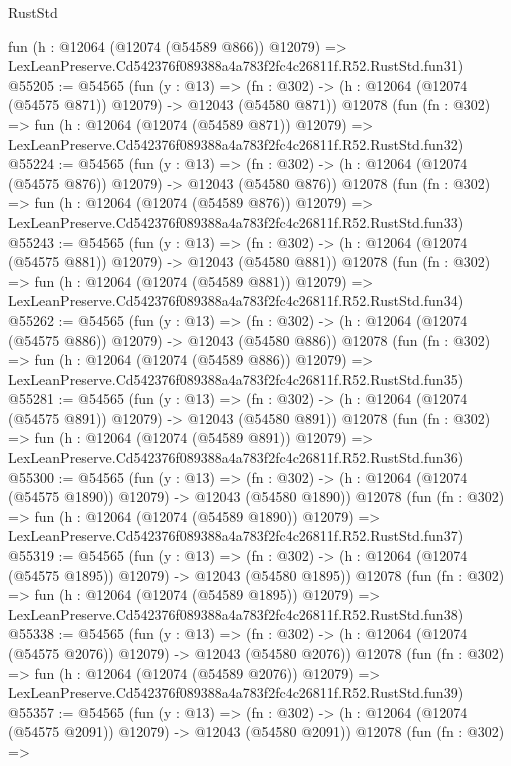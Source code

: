\begin{lexlean}{RustStd}
\begin{coremodule}
    fun (h : @12064 (@12074 (@54589 @866)) @12079) =>
    LexLeanPreserve.Cd542376f089388a4a783f2fc4c26811f.R52.RustStd.fun31)
@55205 := @54565
    (fun (y : @13) =>
    (fn : @302) -> (h : @12064 (@12074 (@54575 @871)) @12079) -> @12043 (@54580 @871))
    @12078
    (fun (fn : @302) =>
    fun (h : @12064 (@12074 (@54589 @871)) @12079) =>
    LexLeanPreserve.Cd542376f089388a4a783f2fc4c26811f.R52.RustStd.fun32)
@55224 := @54565
    (fun (y : @13) =>
    (fn : @302) -> (h : @12064 (@12074 (@54575 @876)) @12079) -> @12043 (@54580 @876))
    @12078
    (fun (fn : @302) =>
    fun (h : @12064 (@12074 (@54589 @876)) @12079) =>
    LexLeanPreserve.Cd542376f089388a4a783f2fc4c26811f.R52.RustStd.fun33)
@55243 := @54565
    (fun (y : @13) =>
    (fn : @302) -> (h : @12064 (@12074 (@54575 @881)) @12079) -> @12043 (@54580 @881))
    @12078
    (fun (fn : @302) =>
    fun (h : @12064 (@12074 (@54589 @881)) @12079) =>
    LexLeanPreserve.Cd542376f089388a4a783f2fc4c26811f.R52.RustStd.fun34)
@55262 := @54565
    (fun (y : @13) =>
    (fn : @302) -> (h : @12064 (@12074 (@54575 @886)) @12079) -> @12043 (@54580 @886))
    @12078
    (fun (fn : @302) =>
    fun (h : @12064 (@12074 (@54589 @886)) @12079) =>
    LexLeanPreserve.Cd542376f089388a4a783f2fc4c26811f.R52.RustStd.fun35)
@55281 := @54565
    (fun (y : @13) =>
    (fn : @302) -> (h : @12064 (@12074 (@54575 @891)) @12079) -> @12043 (@54580 @891))
    @12078
    (fun (fn : @302) =>
    fun (h : @12064 (@12074 (@54589 @891)) @12079) =>
    LexLeanPreserve.Cd542376f089388a4a783f2fc4c26811f.R52.RustStd.fun36)
@55300 := @54565
    (fun (y : @13) =>
    (fn : @302) -> (h : @12064 (@12074 (@54575 @1890)) @12079) -> @12043 (@54580 @1890))
    @12078
    (fun (fn : @302) =>
    fun (h : @12064 (@12074 (@54589 @1890)) @12079) =>
    LexLeanPreserve.Cd542376f089388a4a783f2fc4c26811f.R52.RustStd.fun37)
@55319 := @54565
    (fun (y : @13) =>
    (fn : @302) -> (h : @12064 (@12074 (@54575 @1895)) @12079) -> @12043 (@54580 @1895))
    @12078
    (fun (fn : @302) =>
    fun (h : @12064 (@12074 (@54589 @1895)) @12079) =>
    LexLeanPreserve.Cd542376f089388a4a783f2fc4c26811f.R52.RustStd.fun38)
@55338 := @54565
    (fun (y : @13) =>
    (fn : @302) -> (h : @12064 (@12074 (@54575 @2076)) @12079) -> @12043 (@54580 @2076))
    @12078
    (fun (fn : @302) =>
    fun (h : @12064 (@12074 (@54589 @2076)) @12079) =>
    LexLeanPreserve.Cd542376f089388a4a783f2fc4c26811f.R52.RustStd.fun39)
@55357 := @54565
    (fun (y : @13) =>
    (fn : @302) -> (h : @12064 (@12074 (@54575 @2091)) @12079) -> @12043 (@54580 @2091))
    @12078
    (fun (fn : @302) =>

\end{coremodule}
\end{lexlean}
